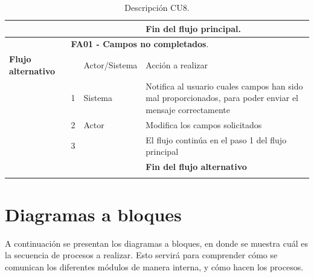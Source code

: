 \begin{longtable}[H]{| p{} | p{} |p{4cm}|p{5cm}|}
     & & & \textbf{Fin del flujo principal}.\\
     \hline
     & \multicolumn{3}{|l|}{\textbf{FA01 - Campos no completados}.}\\
     \hline
     \textbf{Flujo alternativo} & & Actor/Sistema & Acción a realizar\\
     \hline
     & 1 & Sistema & Notifica al usuario cuales campos han sido mal proporcionados, para poder enviar el mensaje correctamente\\
     \hline
     & 2 & Actor & Modifica los campos solicitados\\
     \hline
     & 3 &  & El flujo continúa en el paso 1 del flujo principal\\
     \hline
     &  & & \textbf{Fin del flujo alternativo}\\
     \hline
    \caption{Descripción CU8.}
    \label{tabla:CU8}
\end{longtable}



\pagebreak
\section{Diagramas a bloques}
A continuación se presentan los diagramas a bloques, en donde se muestra cuál es la secuencia de procesos a realizar. Esto servirá para comprender cómo se comunican los diferentes módulos de manera interna, y cómo hacen los procesos.


